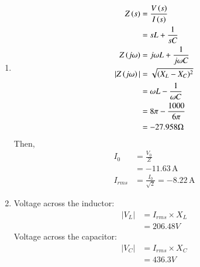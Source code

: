 \documentclass[a4,12pt,onecolumn]{IEEEtran}
\begin{document}
\begin{enumerate}
    \item 
    \begin{align}
    Z\left(s\right) &=\frac{V\left(s\right)}{I\left(s\right)}\\
    &=sL+\frac{1}{sC}\\
    Z\left(j\omega\right) &= j\omega L + \frac{1}{j\omega C}\\
    |Z\left(j\omega\right)| &=\sqrt{(X_L - X_C)^2} \\
    &=\omega L - \frac{1}{\omega C} \\
    &= 8\pi - \frac{1000}{6\pi}\\
    &= -27.958\Omega   
    \end{align}
    Then,
    \begin{align}
        I_0 &= \frac{V_0}{Z} \\
        &= -11.63\, \text{A} \\
        I_{rms} &= \frac{I_0}{\sqrt{2}} = -8.22\, \text{A}
    \end{align}
    
    \item Voltage across the inductor:
    \begin{align}
        |V_L| &= I_{rms} \times X_L \\
        &= 206.48V
    \end{align}
    Voltage across the capacitor:
    \begin{align}
       |V_C| &= I_{rms} \times X_C \\
        &= 436.3V
    \end{align}


\end{enumerate}
\end{document}
